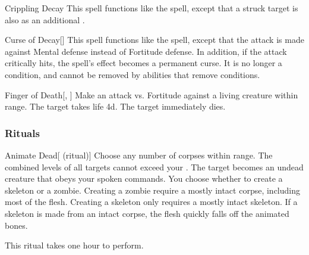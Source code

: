 \lowercase{\hypertarget{spell:Crippling Decay}{}}\label{spell:Crippling Decay}
\begin{ability}[\nth{4}]{\hypertarget{spell:Crippling Decay}{Crippling Decay}}
This spell functions like the  spell, except that a struck target is also  as an additional .
\end{ability}
\vspace{0.25em}



\lowercase{\hypertarget{spell:Curse of Decay}{}}\label{spell:Curse of Decay}
\begin{ability}[\nth{4}]{\hypertarget{spell:Curse of Decay}{Curse of Decay}}[]
This spell functions like the  spell, except that the attack is made against Mental defense instead of Fortitude defense.
In addition, if the attack critically hits, the spell's effect becomes a permanent curse.
It is no longer a condition, and cannot be removed by abilities that remove conditions.
\end{ability}
\vspace{0.25em}



\lowercase{\hypertarget{spell:Finger of Death}{}}\label{spell:Finger of Death}
\begin{ability}[\nth{5}]{\hypertarget{spell:Finger of Death}{Finger of Death}}[, ]
Make an attack vs. Fortitude against a living creature within \rngclose range.
\hit The target takes life  \plus4d.
\crit The target immediately dies.
\end{ability}
\vspace{0.25em}



\subsubsection{Rituals}


\lowercase{\hypertarget{spell:Animate Dead}{}}\label{spell:Animate Dead}
\begin{ability}[\nth{2}]{\hypertarget{spell:Animate Dead}{Animate Dead}}[ (ritual)]
Choose any number of corpses within \rngclose range.
The combined levels of all targets cannot exceed your .
The target becomes an undead creature that obeys your spoken commands.
You choose whether to create a skeleton or a zombie.
Creating a zombie require a mostly intact corpse, including most of the flesh.
Creating a skeleton only requires a mostly intact skeleton.
If a skeleton is made from an intact corpse, the flesh quickly falls off the animated bones.

This ritual takes one hour to perform.
\end{ability}
\vspace{0.25em}


